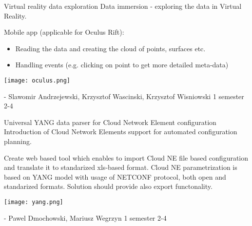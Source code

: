 \begin{project}
{Virtual reality data exploration}
{Data immersion - exploring the data in Virtual Reality.} 
{ 
Mobile app (applicable for Oculus Rift):
\begin{itemize}
	\item Reading the data and creating the cloud of points, surfaces etc.
	\item Handling events (e.g. clicking on point to get more detailed meta-data)
\end{itemize}
\begin{center}\texttt{[image: oculus.png]}\end{center}
}
{-}
{Slawomir Andrzejewski, Krzysztof Wascinski, Krzysztof Wisniowski}
{1 semester}
{2-4}
\end{project}
\begin{project}
{Universal YANG data parser for Cloud Network Element configuration}
{Introduction of Cloud Network Elements support for automated configuration planning.} 
{ 
Create web based tool which enables to import Cloud NE file based configuration and translate it to standarized xls-based format. Cloud NE parametrization is based on YANG model with usage of NETCONF protocol, both open and standarized formats. Solution should provide also export functonality.
\begin{center}\texttt{[image: yang.png]}\end{center}
}
{-}
{Pawel Dmochowski, Mariusz Wegrzyn}
{1 semester}
{2-4}
\end{project}
